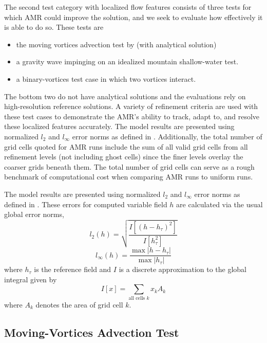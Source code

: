 The second test category with localized flow features consists of three tests for which
AMR could improve the solution, and we seek to evaluate how effectively
it is able to do so. These tests are
\begin{itemize}
    \item
        the moving vortices advection test by
        \cite{Nair:2008fk} (with analytical solution)
    \item
        a gravity wave impinging on an idealized mountain shallow-water
        test.
    \item
        a binary-vortices test case in which two vortices interact.
\end{itemize}
The bottom two do not have analytical solutions and the evaluations rely on
high-resolution reference solutions.
A variety of refinement criteria are used with these test cases to
demonstrate the AMR's ability to track, adapt to, and resolve these
localized features accurately.  The model results are presented using
normalized $l_2$ and $l_\infty$ error norms as defined in
\cite{Williamson:1992kx}.  Additionally, the total number of grid cells
quoted for AMR runs include the sum of all valid grid cells from all
refinement levels (not including ghost cells) since the finer levels
overlay the coarser grids beneath them.  The total number of grid cells
can serve as a rough benchmark of computational cost when comparing AMR
runs to uniform runs.

The model results are presented using
normalized $l_2$ and $l_\infty$ error norms as defined in
\cite{Williamson:1992kx}. These errors for computed variable field $h$ are calculated
 via the usual global error norms,
\begin{equation}
   \label{eq:l2} l_2(h) = \sqrt{\frac{I\left[(h-h_\tau)^2\right]}{I\left[h_\tau^2\right]}}
\end{equation}
\begin{equation}
   \label{eq:lmax} l_\infty(h) = \frac{\max|h-h_\tau|}{\max|h_\tau|}
\end{equation}
where $h_\tau$ is the reference field and $I$ is a discrete approximation
to the global integral given by
\begin{equation}
    \label{eq:globint} I[x] = \sum_{\text{all cells } k} x_k A_k
\end{equation}
where $A_k$ denotes the area of grid cell $k$.

\subsection{Moving-Vortices Advection Test} 
\label{subsec:moving-vortices}

